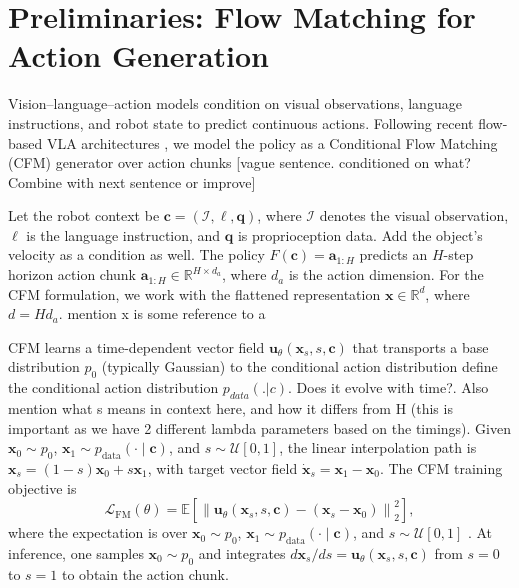 \documentclass[10pt,twocolumn,letterpaper]{article}
\newcommand{\EditAP}[1]{{\color{blue} #1}}
\begin{document}
\section{Preliminaries: Flow Matching for Action Generation}
\label{sec:prelim}

Vision--language--action models condition on visual observations, language
instructions, and robot state to predict continuous actions. Following recent
flow-based VLA architectures \citep{black2025pi0}, we model the policy as a
Conditional Flow Matching (CFM) generator over action chunks \EditAP{[vague sentence. conditioned on what? Combine with next sentence or improve]}

Let the robot context be
$\mathbf c=(\mathcal I,\ell,\mathbf q)$, where $\mathcal I$ denotes the
visual observation, $\ell$ is the language instruction,
and $\mathbf q$ is proprioception data. \EditAP{Add the object's velocity as a condition as well}. The policy $F(\mathbf c) =\mathbf a_{1:H} $ predicts an $H$-step horizon action chunk $\mathbf a_{1:H}\in\mathbb R^{H\times d_a}$, where $d_a$ is the action dimension.
For the CFM formulation, we work with the flattened representation $\mathbf x\in\mathbb R^d$, where $d=H d_a$. \EditAP{mention x is some reference to a}

CFM learns a time-dependent vector field
$\mathbf u_\theta(\mathbf x_s,s,\mathbf c)$ that transports a base
distribution $p_0$ (typically Gaussian) to the conditional action distribution \EditAP{define the conditional action distribution $p_{data}(.|c)$. Does it evolve with time?. Also mention what s means in context here, and how it differs from H (this is important as we have 2 different lambda parameters based on the timings)}.
Given $\mathbf x_0\sim p_0$, $\mathbf x_1\sim p_{\mathrm{data}}(\cdot\mid\mathbf c)$,
and $s\sim\mathcal U[0,1]$, the linear interpolation path is
$\mathbf x_s=(1-s)\mathbf x_0+s\mathbf x_1$,
with target vector field $\dot{\mathbf x}_s=\mathbf x_1-\mathbf x_0$.
The CFM training objective is
\begin{equation}
    \mathcal L_{\mathrm{FM}}(\theta)
    =
    \mathbb E
    \left[
        \left\|
            \mathbf u_\theta(\mathbf x_s,s,\mathbf c)
            -
            (\mathbf x_s-\mathbf x_0)
        \right\|_2^2
    \right],
    \label{eq:fm_loss}
\end{equation}
where the expectation is over
$\mathbf x_0\sim p_0$, $\mathbf x_1\sim p_{\mathrm{data}}(\cdot\mid\mathbf c)$,
and $s\sim\mathcal U[0,1]$ \citep{lipman2023flow,tong2023conditional}.
At inference, one samples $\mathbf x_0\sim p_0$ and integrates
$d\mathbf x_s/ds=\mathbf u_\theta(\mathbf x_s,s,\mathbf c)$ from $s=0$ to
$s=1$ to obtain the action chunk.
\end{document}
